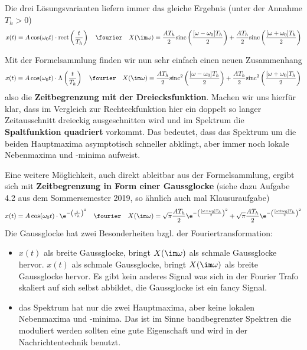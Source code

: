 \begin{Loesung}
Die drei Lösungsvarianten liefern immer das gleiche Ergebnis
(unter der Annahme $T_h>0$)
\begin{equation}
  x(t) = A\cos(\omega_0 t) \cdot \mathrm{rect}\left(\frac{t}{T_h}\right)
  \quad\fourier\quad
  X(\im\omega) = \frac{A T_h}{2} \mathrm{sinc}\left(\frac{[\omega-\omega_0] T_h}{2}\right) +
  \frac{A T_h}{2} \mathrm{sinc}\left(\frac{[\omega+\omega_0] T_h}{2}\right)
\end{equation}
%

Mit der Formelsammlung finden wir nun sehr einfach einen neuen Zusammenhang
\begin{equation}
  x(t) = A\cos(\omega_0 t) \cdot \mathrm{\Lambda}\left(\frac{t}{T_h}\right)
  \quad\fourier\quad
  X(\im\omega) = \frac{A T_h}{2} \mathrm{sinc}^2\left(\frac{[\omega-\omega_0] T_h}{2}\right) +
  \frac{A T_h}{2} \mathrm{sinc}^2\left(\frac{[\omega+\omega_0] T_h}{2}\right)
\end{equation}
also die \textbf{Zeitbegrenzung mit der Dreiecksfunktion}. Machen wir uns hierfür klar,
dass im Vergleich zur Rechteckfunktion hier ein doppelt so langer Zeitausschnitt
dreieckig ausgeschnitten wird und
im Spektrum die \textbf{Spaltfunktion quadriert} vorkommt. Das bedeutet, dass das Spektrum
um die beiden Hauptmaxima asymptotisch schneller abklingt, aber immer noch
lokale Nebenmaxima und -minima aufweist.

Eine weitere Möglichkeit, auch direkt ableitbar aus der Formelsammlung, ergibt sich
mit \textbf{Zeitbegrenzung in Form einer Gaussglocke} (siehe dazu Aufgabe 4.2 aus dem
Sommersemester 2019, so ähnlich auch mal Klausuraufgabe)
\begin{equation}
  x(t) = A\cos(\omega_0 t) \cdot \e^{-\left(\frac{t}{T_h}\right)^2}
  \quad\fourier\quad
  X(\im\omega) =
  \sqrt{\pi} \frac{A T_h}{2} \e^{-\left(\frac{[\omega-\omega_0] T_h}{2}\right)^2}
  +\sqrt{\pi} \frac{A T_h}{2} \e^{-\left(\frac{[\omega+\omega_0] T_h}{2}\right)^2}
\end{equation}
Die Gaussglocke hat zwei Besonderheiten bzgl. der Fouriertransformation:
\begin{itemize}
  \item $x(t)$ als breite Gaussglocke, bringt $X(\im\omega)$ als schmale Gaussglocke hervor.
  $x(t)$ als schmale Gaussglocke, bringt $X(\im\omega)$ als breite Gaussglocke hervor.
  Es gibt kein anderes Signal was sich in der Fourier Trafo skaliert auf sich selbst abbildet,
  die Gaussglocke ist ein fancy Signal.
  \item das Spektrum hat nur die zwei Hauptmaxima, aber keine lokalen Nebenmaxima und -minima.
  Das ist im Sinne bandbegrenzter Spektren die moduliert werden sollten eine gute Eigenschaft
  und wird in der Nachrichtentechnik benutzt.
\end{itemize}


\end{Loesung}






